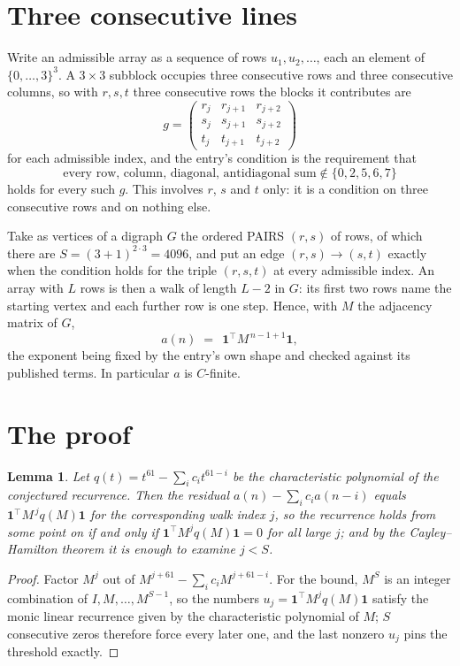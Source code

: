 \documentclass[11pt,a4paper]{article}
\theoremstyle{plain}
\newtheorem{lemma}[theorem]{Lemma}
\theoremstyle{definition}
\begin{document}
\section{Three consecutive lines}

Write an admissible array as a sequence of rows $u_1,u_2,\dots$, each an element of
$\{0,\dots,3\}^{3}$. A $3\times3$ subblock occupies three consecutive rows and
three consecutive columns, so with $r,s,t$ three consecutive rows the blocks it
contributes are
\[
g=\begin{pmatrix}r_j&r_{j+1}&r_{j+2}\\ s_j&s_{j+1}&s_{j+2}\\ t_j&t_{j+1}&t_{j+2}\end{pmatrix}
\]
for each admissible index, and the entry's condition is the requirement that
\[
\text{every row, column, diagonal, antidiagonal sum} \notin \{0,2,5,6,7\}
\]
holds for every such $g$. This involves $r$, $s$ and $t$ only: it is a condition on
three consecutive rows and on nothing else.

Take as vertices of a digraph $G$ the ordered PAIRS $(r,s)$ of rows, of which there are
$S=(3+1)^{2\cdot3}=4096$, and put an edge $(r,s)\to(s,t)$ exactly when the condition
holds for the triple $(r,s,t)$ at every admissible index. An array with $L$ rows is then a
walk of length $L-2$ in $G$: its first two rows name the starting vertex and each further
row is one step. Hence, with $M$ the adjacency matrix of $G$,
\[
a(n)\;=\;\,\mathbf{1}^{\!\top}M^{\,n-1+1}\mathbf{1},
\]
the exponent being fixed by the entry's own shape and checked against its published terms.
In particular $a$ is $C$-finite.

\section{The proof}

\begin{lemma}\label{lem:crit}
Let $q(t)=t^{61}-\sum_i c_it^{61-i}$ be the characteristic polynomial of the
conjectured recurrence. Then the residual $a(n)-\sum_ic_ia(n-i)$ equals
$\mathbf{1}^{\!\top}M^{\,j}q(M)\mathbf{1}$ for the corresponding walk index
$j$, so the recurrence holds from some point on if and only if
$\mathbf{1}^{\!\top}M^{j}q(M)\mathbf{1}=0$ for all large $j$; and by the
Cayley--Hamilton theorem it is enough to examine $j<S$.
\end{lemma}

\begin{proof}
Factor $M^{j}$ out of $M^{j+61}-\sum_ic_iM^{j+61-i}$. For the bound, $M^{S}$
is an integer combination of $I,M,\dots,M^{S-1}$, so the numbers
$u_j=\mathbf{1}^{\!\top}M^{j}q(M)\mathbf{1}$ satisfy the monic linear recurrence given by
the characteristic polynomial of $M$; $S$ consecutive zeros therefore force every later one,
and the last nonzero $u_j$ pins the threshold exactly.
\end{proof}
\end{document}
